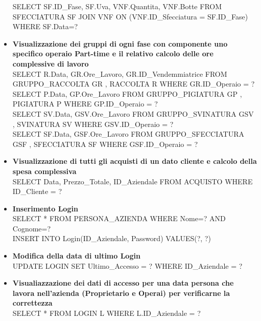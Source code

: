 \documentclass{article}
\begin{document}
\begin{itemize}
SELECT SF.ID\_Fase, SF.Uva, VNF.Quantita, VNF.Botte FROM SFECCIATURA SF JOIN VNF ON (VNF.ID\_Sfecciatura = SF.ID\_Fase) WHERE SF.Data=?\\\newline
\item \textbf{Visualizzazione dei gruppi di ogni fase con componente uno specifico operaio Part-time e il relativo calcolo delle ore complessive di lavoro }\\\newline
SELECT R.Data, GR.Ore\_Lavoro, GR.ID\_Vendemmiatrice FROM GRUPPO\_RACCOLTA GR , RACCOLTA R WHERE GR.ID\_Operaio = ?\\\newline
SELECT P.Data, GP.Ore\_Lavoro FROM GRUPPO\_PIGIATURA GP , PIGIATURA P WHERE GP.ID\_Operaio = ?\\\newline
SELECT SV.Data, GSV.Ore\_Lavoro FROM GRUPPO\_SVINATURA GSV , SVINATURA SV WHERE GSV.ID\_Operaio = ?\\\newline
SELECT SF.Data, GSF.Ore\_Lavoro FROM GRUPPO\_SFECCIATURA GSF , SFECCIATURA SF WHERE GSF.ID\_Operaio = ?\\\newline
\item \textbf{Visualizzazione di tutti gli acquisti di un dato cliente  e calcolo della spesa complessiva }\\\newline
SELECT Data, Prezzo\_Totale, ID\_Aziendale FROM ACQUISTO WHERE ID\_Cliente = ? \\\newline
\item \textbf{Inserimento Login}\\\newline
SELECT * FROM PERSONA\_AZIENDA WHERE Nome=? AND Cognome=? \\\newline
INSERT INTO Login(ID\_Aziendale, Password) VALUES(?, ?)\\\newline
\item \textbf{Modifica della data di ultimo Login}\\\newline
UPDATE LOGIN SET Ultimo\_Accesso = ? WHERE ID\_Aziendale = ? \\\newline
\item \textbf{Visualiazzazione dei dati di accesso per una data persona che lavora nell'azienda (Proprietario e Operai) per verificarne la correttezza }\\\newline
SELECT * FROM LOGIN L WHERE L.ID\_Aziendale = ?\\\newline
\end{itemize}
\newpage
\end{document}

